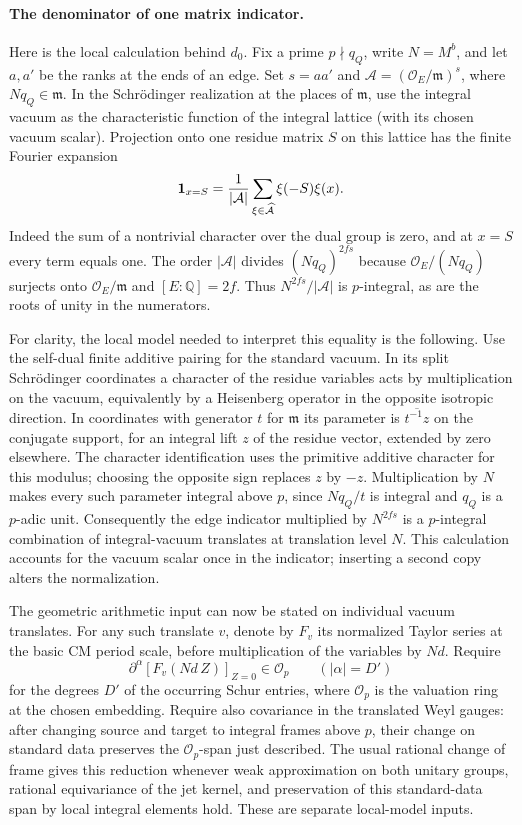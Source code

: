 \paragraph{The denominator of one matrix indicator.}
Here is the local calculation behind $d_0$. Fix a prime $p\nmid q_Q$, write $N=M^b$, and let $a,a'$ be the ranks at the ends of an edge. Set $s=aa'$ and $\mathcal A=(\mathcal O_E/\mathfrak m)^s$, where $Nq_Q\in\mathfrak m$. In the Schr\"odinger realization at the places of $\mathfrak m$, use the integral vacuum as the characteristic function of the integral lattice (with its chosen vacuum scalar). Projection onto one residue matrix $S$ on this lattice has the finite Fourier expansion
\[
 {\bf1}_{x=S}=\frac1{|\mathcal A|}\sum_{\xi\in\widehat{\mathcal A}}\xi(-S)\xi(x).
\]
Indeed the sum of a nontrivial character over the dual group is zero, and at $x=S$ every term equals one. The order $|\mathcal A|$ divides $(Nq_Q)^{2fs}$ because $\mathcal O_E/(Nq_Q)$ surjects onto $\mathcal O_E/\mathfrak m$ and $[E:\mathbb Q]=2f$. Thus $N^{2fs}/|\mathcal A|$ is $p$-integral, as are the roots of unity in the numerators.

For clarity, the local model needed to interpret this equality is the following. Use the self-dual finite additive pairing for the standard vacuum. In its split Schr\"odinger coordinates a character of the residue variables acts by multiplication on the vacuum, equivalently by a Heisenberg operator in the opposite isotropic direction. In coordinates with generator $t$ for $\mathfrak m$ its parameter is $\overline{t^{-1}z}$ on the conjugate support, for an integral lift $z$ of the residue vector, extended by zero elsewhere. The character identification uses the primitive additive character for this modulus; choosing the opposite sign replaces $z$ by $-z$. Multiplication by $N$ makes every such parameter integral above $p$, since $Nq_Q/t$ is integral and $q_Q$ is a $p$-adic unit. Consequently the edge indicator multiplied by $N^{2fs}$ is a $p$-integral combination of integral-vacuum translates at translation level $N$. This calculation accounts for the vacuum scalar once in the indicator; inserting a second copy alters the normalization.

The geometric arithmetic input can now be stated on individual vacuum translates. For any such translate $v$, denote by $F_v$ its normalized Taylor series at the basic CM period scale, before multiplication of the variables by $Nd$. Require
\[
 \partial^\alpha[F_v(Nd\,Z)]_{Z=0}\in\mathcal O_p
 \qquad (|\alpha|=D')
\]
for the degrees $D'$ of the occurring Schur entries, where $\mathcal O_p$ is the valuation ring at the chosen embedding. Require also covariance in the translated Weyl gauges: after changing source and target to integral frames above $p$, their change on standard data preserves the $\mathcal O_p$-span just described. The usual rational change of frame gives this reduction whenever weak approximation on both unitary groups, rational equivariance of the jet kernel, and preservation of this standard-data span by local integral elements hold. These are separate local-model inputs.

